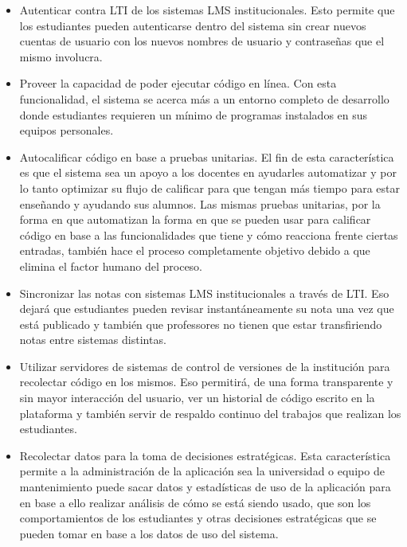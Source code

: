 \begin{itemize}
	\item Autenticar contra LTI de los sistemas LMS institucionales. Esto permite que los estudiantes pueden autenticarse dentro del sistema sin crear nuevos cuentas de usuario con los nuevos nombres de usuario y contraseñas que el mismo involucra.
    \item Proveer la capacidad de poder ejecutar código en línea. Con esta funcionalidad, el sistema se acerca más a un entorno completo de desarrollo donde estudiantes requieren un mínimo de programas instalados en sus equipos personales.
    \item Autocalificar código en base a pruebas unitarias. El fin de esta característica es que el sistema sea un apoyo a los docentes en ayudarles automatizar y por lo tanto optimizar su flujo de calificar para que tengan más tiempo para estar enseñando y ayudando sus alumnos. Las mismas pruebas unitarias, por la forma en que automatizan la forma en que se pueden usar para calificar código en base a las funcionalidades que tiene y cómo reacciona frente ciertas entradas, también hace el proceso completamente objetivo debido a que elimina el factor humano del proceso.
    \item Sincronizar las notas con sistemas LMS institucionales a través de LTI. Eso dejará que estudiantes pueden revisar instantáneamente su nota una vez que está publicado y también que professores no tienen que estar transfiriendo notas entre sistemas distintas.
    \item Utilizar servidores de sistemas de control de versiones de la institución para recolectar código en los mismos. Eso permitirá, de una forma transparente y sin mayor interacción del usuario, ver un historial de código escrito en la plataforma y también servir de respaldo continuo del trabajos que realizan los estudiantes.
    \item Recolectar datos para la toma de decisiones estratégicas. Esta característica permite a la administración de la aplicación sea la universidad o equipo de mantenimiento puede sacar datos y estadísticas de uso de la aplicación para en base a ello realizar análisis de cómo se está siendo usado, que son los comportamientos de los estudiantes y otras decisiones estratégicas que se pueden tomar en base a los datos de uso del sistema.
\end{itemize}

